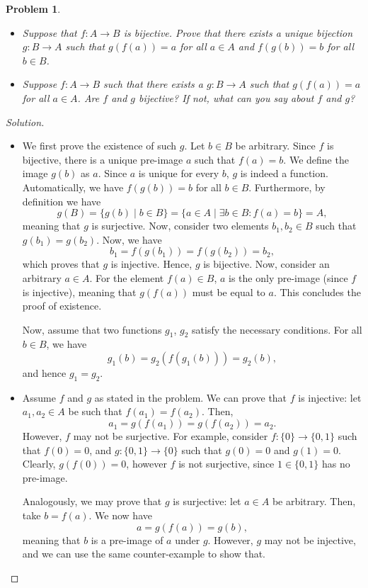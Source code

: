 \documentclass[a4paper, 12pt]{article}
\theoremstyle{plain}
\newtheorem{problem}{Problem}
\begin{document}
\begin{problem}~
    \begin{itemize}
        \item[(a)] Suppose that $f \colon A \to B$ is bijective. Prove that there exists a unique bijection $g \colon B \to A$ such that $g(f(a)) = a$ for all $a \in A$ and $f(g(b)) = b$ for all $b \in B$.
        \item[(b)] Suppose $f \colon A \to B$ such that there exists a $g \colon B \to A$ such that $g(f(a)) = a$ for all $a \in A$. Are $f$ and $g$ bijective? If not, what can you say about $f$ and $g$?
    \end{itemize}
\end{problem}
\begin{proof}[Solution]~
    \begin{itemize}
        \item[(a)]
            We first prove the existence of such $g$. Let $b \in B$ be arbitrary. Since $f$ is bijective, there is a unique pre-image $a$ such that $f(a) = b$. We define the image $g(b)$ as $a$. Since $a$ is unique for every $b$, $g$ is indeed a function. Automatically, we have $f(g(b)) = b$ for all $b \in B$. Furthermore, by definition we have
            \[
                g(B) = \{ g(b) \mid b \in B \} = \{ a \in A \mid \exists b \in B: f(a) = b \} = A,
            \]
            meaning that $g$ is surjective. Now, consider two elements $b_1, b_2 \in B$ such that $g(b_1) = g(b_2)$. Now, we have
            \[
                b_1 = f(g(b_1)) = f(g(b_2)) = b_2,
            \]
            which proves that $g$ is injective. Hence, $g$ is bijective. Now, consider an arbitrary $a \in A$. For the element $f(a) \in B$, $a$ is the only pre-image (since $f$ is injective), meaning that $g(f(a))$ must be equal to $a$. This concludes the proof of existence.

            Now, assume that two functions $g_1$, $g_2$ satisfy the necessary conditions. For all $b \in B$, we have
            \[ g_1(b) = g_2(f(g_1(b))) = g_2(b), \]
            and hence $g_1 = g_2$.

        \item[(b)]
            Assume $f$ and $g$ as stated in the problem. We can prove that $f$ is injective: let $a_1, a_2 \in A$ be such that $f(a_1) = f(a_2)$. Then,
            \[ a_1 = g(f(a_1)) = g(f(a_2)) = a_2. \]
            However, $f$ may not be surjective. For example, consider $f \colon \{0\} \to \{0,1\}$ such that $f(0) = 0$, and $g \colon \{0, 1\} \to \{0\}$ such that $g(0) = 0$ and $g(1) = 0$. Clearly, $g(f(0)) = 0$, however $f$ is not surjective, since $1 \in \{0,1\}$ has no pre-image.

            Analogously, we may prove that $g$ is surjective: let $a \in A$ be arbitrary. Then, take $b = f(a)$. We now have
            \[ a = g(f(a)) = g(b), \]
            meaning that $b$ is a pre-image of $a$ under $g$. However, $g$ may not be injective, and we can use the same counter-example to show that.
    \end{itemize}
\end{proof}
\end{document}
